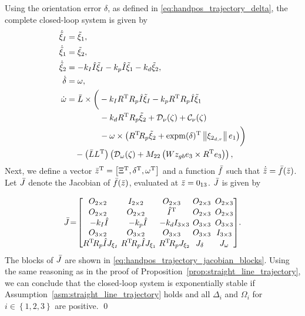 Using the orientation error $\delta$, as defined in \eqref{eq:handpos_trajectory_delta}, the complete closed-loop system is given by
\begin{subequations}
    \begin{align}
        \dot{\tilde{\xi}}_I &= \tilde{\xi}_1, \\
        \dot{\tilde{\xi}}_1 &= \tilde{\xi}_2, \\
        \dot{\tilde{\xi}}_2 &= -k_I \hat{I} \tilde{\xi}_I - k_p \hat{I} \tilde{\xi}_1 - k_d \tilde{\xi}_2, \\
        \dot{\delta} &= \omega, \\
        \dot{\omega} &= \Bar{L} \times \bigg(-k_I R^{\mathrm{T}} R_p \hat{I} \tilde{\xi}_I - k_p R^{\mathrm{T}} R_p \hat{I} \tilde{\xi}_1 \nonumber \\
        &\qquad \qquad - k_d R^{\mathrm{T}} R_p \tilde{\xi}_2 + \mathcal{D}_{\nu}(\zeta) + \mathcal{C}_{\nu}(\zeta) \nonumber \\
        &\qquad \qquad - \omega \times \left(R^{\mathrm{T}}\! R_p \tilde{\xi}_2 + {\rm expm}(\delta)^{\mathrm{T}} \left\|\xi_{2_{d,r}}\right\|e_1\right)\!\bigg) \nonumber \\
        &\quad - \left(\Bar{L}L^{\mathrm{T}}\right) \left(\mathcal{D}_{\omega}(\zeta) + M_{22}\left(Wz_{gb} e_3 \times R^{\mathrm{T}} e_3\right)\right),
    \end{align}
\end{subequations}
Next, we define a vector $\Bar{z}^{\mathrm{T}} = \left[\Xi^{\mathrm{T}}, \delta^{\mathrm{T}}, \omega^{\mathrm{T}}\right]$ and a function $\Bar{f}$ such that $\dot{\Bar{z}} = \Bar{f}(\Bar{z})$.
Let $\Bar{J}$ denote the Jacobian of $\Bar{f}(\Bar{z})$, evaluated at $\Bar{z} = 0_{13}$.
$\Bar{J}$ is given by

\begin{equation}
    \Bar{J} \!=\! \begin{bmatrix}
        O_{2 \times 2} & I_{2 \times 2} & O_{2 \times 3} & O_{2 \times 3}\!\!\! & O_{2 \times 3} \\
        O_{2 \times 2} & O_{2 \times 2} & \hat{I}\T & O_{2 \times 3}\!\!\! & O_{2 \times 3} \\
        -k_I \hat{I}\!\! & -k_p \hat{I}\!\!\! & -k_d I_{3 \times 3}\!\!\!\! & O_{3 \times 3}\!\!\! & O_{3 \times 3} \\
        O_{3 \times 2} & O_{3 \times 2} & O_{3 \times 3} & O_{3 \times 3}\!\!\! & I_{3 \times 3} \\
        R\T\! R_p \hat{I}J_{\xi_I}\!\!\!\! & R\T\! R_p \hat{I}J_{\xi_1}\!\!\!\! & R\T\! R_p J_{\xi_2}\!\!\!\! & J_{\delta} & J_{\omega}
    \end{bmatrix}\!. \label{eq:handpos_trajectory_path_jacobian}
\end{equation}
The blocks of $\Bar{J}$ are shown in \eqref{eq:handpos_trajectory_jacobian_blocks}.
Using the same reasoning as in the proof of Proposition~\ref{prop:straight_line_trajectory}, we can conclude that the closed-loop system is exponentially stable if Assumption~\ref{asm:straight_line_trajectory} holds and all $\Delta_i$ and $\Omega_i$ for $i \in \left\{1,2,3\right\}$ are positive. \qed

